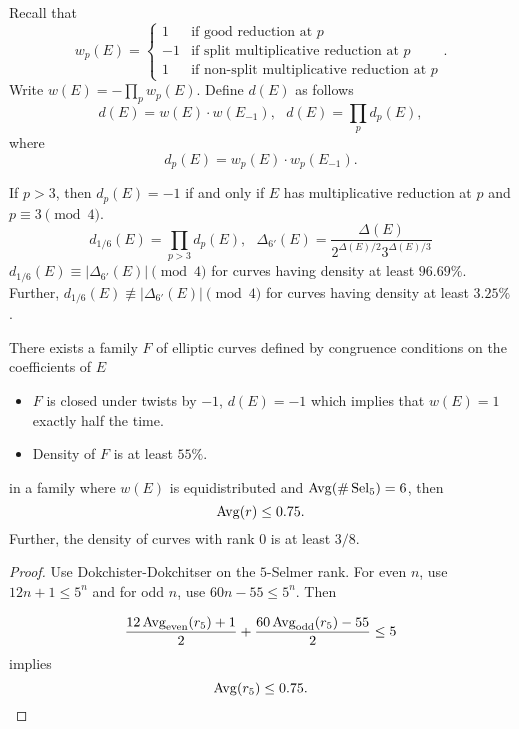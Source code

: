 \documentclass[12pt,amsfont]{amsart}
\begin{document}
Recall that
\[w_p(E) = \begin{cases} 1 & \text{if good reduction at } p \\ -1 & \text{if split multiplicative reduction at } p \\ 1 & \text{if non-split multiplicative reduction at } p \end{cases} .\]
Write $w(E) = -\prod_p w_p(E)$. Define $d(E)$ as follows
\[d(E) = w(E) \cdot w(E_{-1}), \text{ } d(E) = \prod_p d_p(E),\]
where
\[d_p(E) = w_p(E) \cdot w_p(E_{-1}).\]

\begin{lem} If $p > 3$, then $d_p(E) = -1$ if and only if $E$ has multiplicative reduction at $p$ and $p \equiv 3 \pmod{4}$. 
\[d_{1/6}(E) = \prod_{p > 3} d_p(E), \text{ } \Delta_{6'}(E) = \frac{\Delta(E)}{2^{\Delta(E)/2} 3^{\Delta(E)/3}} \]
$d_{1/6}(E) \equiv |\Delta_{6'}(E)| \pmod{4} $ for curves having density at least $96.69\%$. Further, $d_{1/6}(E) \not \equiv |\Delta_{6'}(E)| \pmod{4}$ for curves having density at least $3.25\%$.  
\end{lem} 

\begin{thm} There exists a family $F$ of elliptic curves defined by congruence conditions on the coefficients of $E$ 
\begin{itemize}
\item
$F$ is closed under twists by $-1$, $d(E) = -1$ which implies that $w(E) = 1$ exactly half the time. 
\item
Density of $F$ is at least $55\%$. 
\end{itemize}
\end{thm}

\begin{thm} in a family where $w(E)$ is equidistributed and $\operatorname{Avg}(\#\operatorname{Sel}_5) = 6$, then
\[\operatorname{Avg}(r) \leq 0.75.\]
Further, the density of curves with rank 0 is at least $3/8$.
\end{thm}

\begin{proof} Use Dokchister-Dokchitser  on the $5$-Selmer rank. For even $n$, use $12n+1 \leq 5^n$ and for odd $n$, use $60n-55 \leq 5^n$. Then

\[\frac{12 \operatorname{Avg}_{\text{even}}(r_5) + 1}{2} + \frac{60 \operatorname{Avg}_{\text{odd}}(r_5) - 55}{2} \leq 5 \]
implies
\[\operatorname{Avg}(r_5) \leq 0.75.\]

\end{proof}
\renewcommand{\thesubsection}{\arabic{section}.R}
\begingroup
\renewcommand{\addcontentsline}[3]{}%
\endgroup
\end{document}
